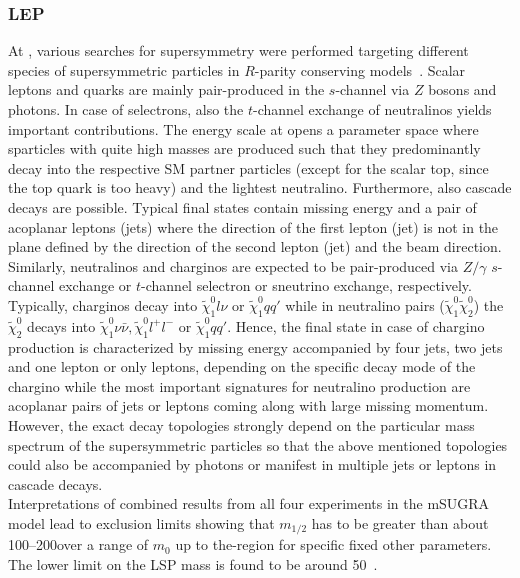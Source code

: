\subsubsection*{LEP}
At \lep, various searches for supersymmetry were performed targeting different species of supersymmetric particles in $R$-parity conserving models~\cite{LEPLimits}. Scalar leptons and quarks are mainly pair-produced in the $s$-channel via $Z$ bosons and photons. In case of selectrons, also the $t$-channel exchange of neutralinos yields important contributions. The energy scale at \lep opens a parameter space where sparticles with quite high masses are produced such that they predominantly decay into the respective SM partner particles (except for the scalar top, since the top quark is too heavy) and the lightest neutralino. Furthermore, also cascade decays are possible. Typical final states contain missing energy and a pair of acoplanar leptons (jets) where the direction of the first lepton (jet) is not in the plane defined by the direction of the second lepton (jet) and the beam direction. \\
Similarly, neutralinos and charginos are expected to be pair-produced via $Z/\gamma$ $s$-channel exchange or $t$-channel selectron or sneutrino exchange, respectively. Typically, charginos decay into $\tilde{\chi}_{1}^{0}l\nu$ or $\tilde{\chi}_{1}^{0} qq'$ while in neutralino pairs ($\tilde{\chi}_{1}^{0}\tilde{\chi}_{2}^{0}$) the $\tilde{\chi}_{2}^{0}$ decays into $\tilde{\chi}_{1}^{0} \nu \bar{\nu}, \tilde{\chi}_{1}^{0} l^+ l^-$ or $\tilde{\chi}_{1}^{0} qq'$. Hence, the final state in case of chargino production is characterized by missing energy accompanied by four jets, two jets and one lepton or only leptons, depending on the specific decay mode of the chargino while the most important signatures for neutralino production are acoplanar pairs of jets or leptons coming along with large missing momentum. However, the exact decay topologies strongly depend on the particular mass spectrum of the supersymmetric particles so that the above mentioned topologies could also be accompanied by photons or manifest in multiple jets or leptons in cascade decays. \\
Interpretations of combined results from all four experiments in the mSUGRA model lead to exclusion limits showing that $m_{1/2}$ has to be greater than about 100--200\gev over a range of $m_{0}$ up to the\tev-region for specific fixed other parameters. The lower limit on the LSP mass is found to be around 50\gev~\cite{LEPLimits}. 


